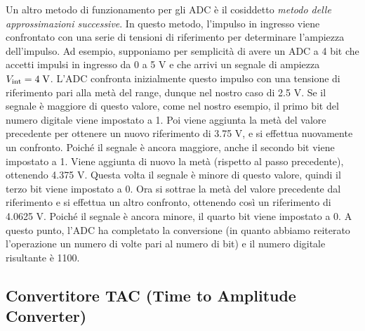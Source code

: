 Un altro metodo di funzionamento per gli ADC è il cosiddetto \textit{metodo delle approssimazioni successive}. In questo metodo, l'impulso in ingresso viene confrontato con una serie di tensioni di riferimento per determinare l'ampiezza dell'impulso. Ad esempio, supponiamo per semplicità di avere un ADC a 4 bit che accetti impulsi in ingresso da 0 a 5 V e che arrivi un segnale di ampiezza $V_{\rm int}= 4 \; \rm V$. L'ADC confronta inizialmente questo impulso con una tensione di riferimento pari alla metà del range, dunque nel nostro caso di 2.5 V. Se il segnale è maggiore di questo valore, come nel nostro esempio, il primo bit del numero digitale viene impostato a 1. Poi viene aggiunta la metà del valore precedente per ottenere un nuovo riferimento di 3.75 V, e si effettua nuovamente un confronto. Poiché il segnale è ancora maggiore, anche il secondo bit viene impostato a 1. Viene aggiunta di nuovo la metà (rispetto al passo precedente), ottenendo 4.375 V. Questa volta il segnale è minore di questo valore, quindi il terzo bit viene impostato a 0. Ora si sottrae la metà del valore precedente dal riferimento e si effettua un altro confronto, ottenendo così un riferimento di 4.0625 V. Poiché il segnale è ancora minore, il quarto bit viene impostato a 0. A questo punto, l'ADC ha completato la conversione (in quanto abbiamo reiterato l'operazione un numero di volte pari al numero di bit) e il numero digitale risultante è 1100.

\subsection{Convertitore TAC (Time to Amplitude Converter)}

